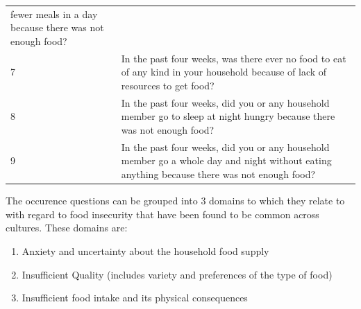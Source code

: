 \documentclass[12pt,]{book}
\providecommand{\tightlist}{%
  \setlength{\itemsep}{0pt}\setlength{\parskip}{0pt}}
\theoremstyle{definition}
\theoremstyle{definition}
\theoremstyle{definition}
\theoremstyle{remark}
\begin{document}
\begin{longtable}[]{@{}ll@{}}
\begin{minipage}[t]{0.83\columnwidth}
fewer meals in a day because there was not enough food?\strut
\end{minipage}\tabularnewline
\begin{minipage}[t]{0.11\columnwidth}\raggedright
7\strut
\end{minipage} & \begin{minipage}[t]{0.83\columnwidth}\raggedright
In the past four weeks, was there ever no food to eat of any kind in
your household because of lack of resources to get food?\strut
\end{minipage}\tabularnewline
\begin{minipage}[t]{0.11\columnwidth}\raggedright
8\strut
\end{minipage} & \begin{minipage}[t]{0.83\columnwidth}\raggedright
In the past four weeks, did you or any household member go to sleep at
night hungry because there was not enough food?\strut
\end{minipage}\tabularnewline
\begin{minipage}[t]{0.11\columnwidth}\raggedright
9\strut
\end{minipage} & \begin{minipage}[t]{0.83\columnwidth}\raggedright
In the past four weeks, did you or any household member go a whole day
and night without eating anything because there was not enough
food?\strut
\end{minipage}\tabularnewline
\bottomrule
\end{longtable}

The occurence questions can be grouped into 3 domains to which they
relate to with regard to food insecurity that have been found to be
common across cultures. These domains are:

\begin{enumerate}
\def\labelenumi{\arabic{enumi}.}
\tightlist
\item
  Anxiety and uncertainty about the household food supply
\item
  Insufficient Quality (includes variety and preferences of the type of
  food)
\item
  Insufficient food intake and its physical consequences
\end{enumerate}


\end{document}
